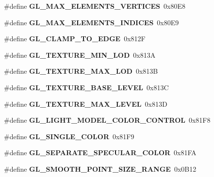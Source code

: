 \begin{DoxyCompactItemize}
\item 
\#define {\bfseries G\+L\+\_\+\+M\+A\+X\+\_\+\+E\+L\+E\+M\+E\+N\+T\+S\+\_\+\+V\+E\+R\+T\+I\+C\+E\+S}~0x80\+E8\label{_s_d_l__opengl_8h_ab6be24928d250f1a9e4e3d34a3ae9f4a}

\item 
\#define {\bfseries G\+L\+\_\+\+M\+A\+X\+\_\+\+E\+L\+E\+M\+E\+N\+T\+S\+\_\+\+I\+N\+D\+I\+C\+E\+S}~0x80\+E9\label{_s_d_l__opengl_8h_a9dd94df46c02d0d705915fda674ab1f4}

\item 
\#define {\bfseries G\+L\+\_\+\+C\+L\+A\+M\+P\+\_\+\+T\+O\+\_\+\+E\+D\+G\+E}~0x812\+F\label{_s_d_l__opengl_8h_ae90f81f48642444b4ba7fa5cacf40569}

\item 
\#define {\bfseries G\+L\+\_\+\+T\+E\+X\+T\+U\+R\+E\+\_\+\+M\+I\+N\+\_\+\+L\+O\+D}~0x813\+A\label{_s_d_l__opengl_8h_ae3c158c6a713b4faa2e8616292368f36}

\item 
\#define {\bfseries G\+L\+\_\+\+T\+E\+X\+T\+U\+R\+E\+\_\+\+M\+A\+X\+\_\+\+L\+O\+D}~0x813\+B\label{_s_d_l__opengl_8h_aaa37f45604d20d8984672d908e608c5e}

\item 
\#define {\bfseries G\+L\+\_\+\+T\+E\+X\+T\+U\+R\+E\+\_\+\+B\+A\+S\+E\+\_\+\+L\+E\+V\+E\+L}~0x813\+C\label{_s_d_l__opengl_8h_a4054a5aebcfc3a6e1566802d1ecb161d}

\item 
\#define {\bfseries G\+L\+\_\+\+T\+E\+X\+T\+U\+R\+E\+\_\+\+M\+A\+X\+\_\+\+L\+E\+V\+E\+L}~0x813\+D\label{_s_d_l__opengl_8h_a48898b4f27c2e100bd856fd4ea66d774}

\item 
\#define {\bfseries G\+L\+\_\+\+L\+I\+G\+H\+T\+\_\+\+M\+O\+D\+E\+L\+\_\+\+C\+O\+L\+O\+R\+\_\+\+C\+O\+N\+T\+R\+O\+L}~0x81\+F8\label{_s_d_l__opengl_8h_ad46e3a863ebaff593693904190edbe22}

\item 
\#define {\bfseries G\+L\+\_\+\+S\+I\+N\+G\+L\+E\+\_\+\+C\+O\+L\+O\+R}~0x81\+F9\label{_s_d_l__opengl_8h_af71a33341136f2a30f241af8107e9eed}

\item 
\#define {\bfseries G\+L\+\_\+\+S\+E\+P\+A\+R\+A\+T\+E\+\_\+\+S\+P\+E\+C\+U\+L\+A\+R\+\_\+\+C\+O\+L\+O\+R}~0x81\+F\+A\label{_s_d_l__opengl_8h_ada3e23d2924780debb18fbe2f9c54fb9}

\item 
\#define {\bfseries G\+L\+\_\+\+S\+M\+O\+O\+T\+H\+\_\+\+P\+O\+I\+N\+T\+\_\+\+S\+I\+Z\+E\+\_\+\+R\+A\+N\+G\+E}~0x0\+B12\label{_s_d_l__opengl_8h_a4e846c594d59f16b86215e553fb574b6}


\end{DoxyCompactItemize}
